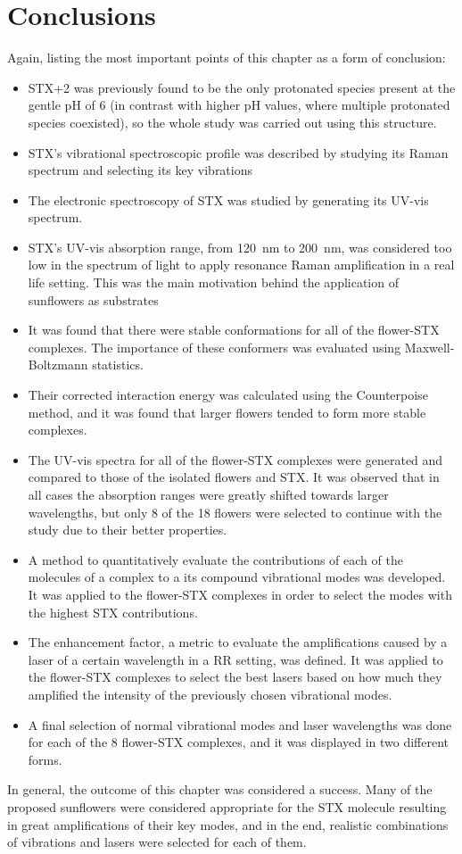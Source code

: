 \section{Conclusions}

Again, listing the most important points of this chapter as a form of conclusion:

\begin{itemize}
    \item STX+2 was previously found to be the only protonated species present at the gentle pH of 6 (in contrast with higher pH values, where multiple protonated species coexisted), so the whole study was carried out using this structure.
    \item STX's vibrational spectroscopic profile was described by studying its Raman spectrum and selecting its key vibrations
    \item The electronic spectroscopy of STX was studied by generating its UV-vis spectrum.
    \item STX's UV-vis absorption range, from \SI{120}{\nano\metre} to \SI{200}{\nano\metre}, was considered too low in the spectrum of light to apply resonance Raman amplification in a real life setting. This was the main motivation behind the application of sunflowers as substrates
    \item It was found that there were stable conformations for all of the flower-STX complexes. The importance of these conformers was evaluated using Maxwell-Boltzmann statistics.
    \item Their corrected interaction energy was calculated using the Counterpoise method, and it was found that larger flowers tended to form more stable complexes.
    \item The UV-vis spectra for all of the flower-STX complexes were generated and compared to those of the isolated flowers and STX. It was observed that in all cases the absorption ranges were greatly shifted towards larger wavelengths, but only 8 of the 18 flowers were selected to continue with the study due to their better properties.
    \item A method to quantitatively evaluate the contributions of each of the molecules of a complex to a its compound vibrational modes was developed. It was applied to the flower-STX complexes in order to select the modes with the highest STX contributions.
    \item The enhancement factor, a metric to evaluate the amplifications caused by a laser of a certain wavelength in a RR setting, was defined. It was applied to the flower-STX complexes to select the best lasers based on how much they amplified the intensity of the previously chosen vibrational modes.
    \item A final selection of normal vibrational modes and laser wavelengths was done for each of the 8 flower-STX complexes, and it was displayed in two different forms.
\end{itemize}

In general, the outcome of this chapter was considered a success.
Many of the proposed sunflowers were considered appropriate for the STX molecule resulting in great amplifications of their key modes, and in the end, realistic combinations of vibrations and lasers were selected for each of them.
